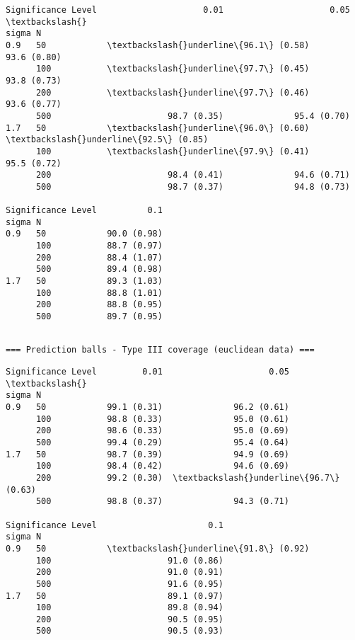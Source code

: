\documentclass[11pt]{article}
\begin{document}
    
    \begin{Verbatim}[commandchars=\\\{\}]
Significance Level                     0.01                     0.05  \textbackslash{}
sigma N                                                                
0.9   50            \textbackslash{}underline\{96.1\} (0.58)              93.6 (0.80)   
      100           \textbackslash{}underline\{97.7\} (0.45)              93.8 (0.73)   
      200           \textbackslash{}underline\{97.7\} (0.46)              93.6 (0.77)   
      500                       98.7 (0.35)              95.4 (0.70)   
1.7   50            \textbackslash{}underline\{96.0\} (0.60)  \textbackslash{}underline\{92.5\} (0.85)   
      100           \textbackslash{}underline\{97.9\} (0.41)              95.5 (0.72)   
      200                       98.4 (0.41)              94.6 (0.71)   
      500                       98.7 (0.37)              94.8 (0.73)   

Significance Level          0.1  
sigma N                          
0.9   50            90.0 (0.98)  
      100           88.7 (0.97)  
      200           88.4 (1.07)  
      500           89.4 (0.98)  
1.7   50            89.3 (1.03)  
      100           88.8 (1.01)  
      200           88.8 (0.95)  
      500           89.7 (0.95)  
    \end{Verbatim}

    
    \begin{Verbatim}[commandchars=\\\{\}]

=== Prediction balls - Type III coverage (euclidean data) ===
    \end{Verbatim}

    
    \begin{Verbatim}[commandchars=\\\{\}]
Significance Level         0.01                     0.05  \textbackslash{}
sigma N                                                    
0.9   50            99.1 (0.31)              96.2 (0.61)   
      100           98.8 (0.33)              95.0 (0.61)   
      200           98.6 (0.33)              95.0 (0.69)   
      500           99.4 (0.29)              95.4 (0.64)   
1.7   50            98.7 (0.39)              94.9 (0.69)   
      100           98.4 (0.42)              94.6 (0.69)   
      200           99.2 (0.30)  \textbackslash{}underline\{96.7\} (0.63)   
      500           98.8 (0.37)              94.3 (0.71)   

Significance Level                      0.1  
sigma N                                      
0.9   50            \textbackslash{}underline\{91.8\} (0.92)  
      100                       91.0 (0.86)  
      200                       91.0 (0.91)  
      500                       91.6 (0.95)  
1.7   50                        89.1 (0.97)  
      100                       89.8 (0.94)  
      200                       90.5 (0.95)  
      500                       90.5 (0.93)  
    \end{Verbatim}
\end{document}
